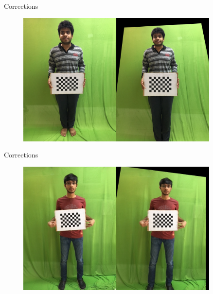 \documentclass{beamer}
\begin{document}

\begin{frame}{Corrections}
\begin{figure}[h]
\includegraphics[width=0.9\textwidth]{affine_correction_2.jpg}
\end{figure}
\end{frame}

\begin{frame}{Corrections}
\begin{figure}[h]
\includegraphics[width=0.9\textwidth]{affine_correction_3.jpg}
\end{figure}
\end{frame}




\end{document}
